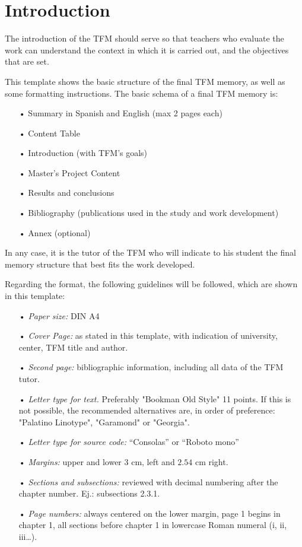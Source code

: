 \chapter{Introduction}
The introduction of the TFM should serve so that teachers who evaluate the work can understand the context in which it is carried out, and the objectives that are set.

This template shows the basic structure of the final TFM memory, as well as some formatting instructions.
The basic schema of a final  TFM memory is:
\begin{itemize}
\item[•] Summary in Spanish and English (max 2 pages each)
\item[•] Content Table
\item[•] Introduction (with TFM's goals)
\item[•] Master’s Project Content
\item[•] Results and conclusions
\item[•] Bibliography (publications used in the study and work development)
\item[•] Annex (optional)
\end{itemize}


In any case, it is the tutor of the TFM who will indicate to his student the final memory structure that best fits the work developed.

Regarding the format, the following guidelines will be followed, which are shown in this template:
\begin{itemize}
\item[•] \textit{Paper size:} DIN A4
\item[•] \textit{Cover Page:} as stated in this template, with indication of university, center, TFM title and author.
\item[•] \textit{Second page:} bibliographic information, including all data of the TFM tutor.
\item[•] \textit{Letter type for text.} Preferably "Bookman Old Style" 11 points. If this is not possible, the recommended alternatives are, in order of preference: "Palatino Linotype", "Garamond" or "Georgia".
\item[•] \textit{Letter type for source code:} “Consolas” or “Roboto mono”
\item[•] \textit{Margins:} upper and lower $3$ cm, left and $2.54$ cm right.
\item[•] \textit{Sections and subsections:} reviewed with decimal numbering after the chapter number. Ej.: subsections 2.3.1.
\item[•] \textit{Page numbers:} always centered on the lower margin, page 1 begins in chapter 1, all sections before chapter 1 in lowercase Roman numeral (i, ii, iii…).
\end{itemize}

